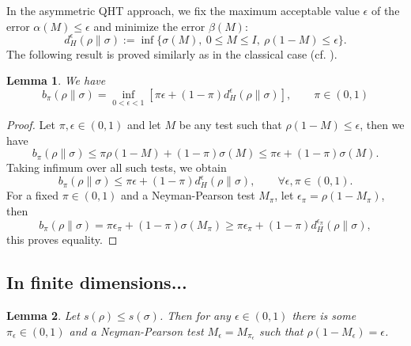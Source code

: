 \documentclass[12pt]{article}
\newtheorem{lemma}{Lemma}
\theoremstyle{definition}
\theoremstyle{remark}
\begin{document}
In the asymmetric QHT approach, we fix the maximum acceptable value $\epsilon$ of the error
$\alpha(M)\le \epsilon$ and minimize the error $\beta(M)$:
\[
d_H^\epsilon(\rho\|\sigma):=\inf\{\sigma(M),\ 0\le M\le I,\ \rho(1-M)\le
\epsilon\}.
\]
The following result is proved similarly as in the classical case (cf. \cite{liese...}).

\begin{lemma}\label{lemma:btodh} We have
\[
b_\pi(\rho\|\sigma)=\inf_{0<\epsilon<1}[
\pi\epsilon+(1-\pi)d_H^\epsilon(\rho\|\sigma)],\qquad \pi\in (0,1)
\]


\end{lemma}

\begin{proof}
Let $\pi,\epsilon \in (0,1)$ and let $M$ be any test such that $\rho(1-M)\le
\epsilon$, then we have
\[
b_\pi(\rho\|\sigma)\le \pi\rho(1-M)+(1-\pi)\sigma(M)\le
\pi\epsilon+(1-\pi)\sigma(M).
\]
Taking infimum over all such tests, we obtain
\begin{equation}\label{eq:bled}
b_\pi(\rho\|\sigma)\le \pi\epsilon +(1-\pi)d_H^\epsilon(\rho\|\sigma),\qquad \forall
\epsilon,\pi\in (0,1).
\end{equation}
For a fixed $\pi\in (0,1)$ and a Neyman-Pearson test $M_\pi$, let
$\epsilon_\pi=\rho(1-M_\pi)$, then
\[
b_\pi(\rho\|\sigma)=\pi\epsilon_\pi+(1-\pi)\sigma(M_\pi)\ge
\pi\epsilon_\pi+(1-\pi)d_H^{\epsilon_\pi}(\rho\|\sigma),
\]
this proves equality. 

\end{proof}

\subsection{In finite dimensions...}


\begin{lemma}\label{lemma:NPepsilon} Let $s(\rho)\le s(\sigma)$. Then for any $\epsilon\in
(0,1)$ there is some $\pi_\epsilon\in (0,1)$ and a Neyman-Pearson test
$M_\epsilon=M_{\pi_\epsilon}$ such that $\rho(1- M_\epsilon)=\epsilon$.

\end{lemma}
\end{document}
